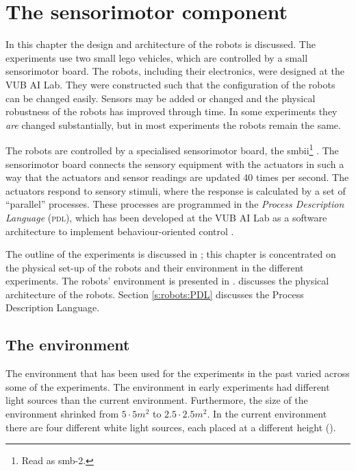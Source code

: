 \chapter{The sensorimotor component}\label{ch:robots}

In this chapter the design and architecture of the robots is discussed. The experiments use two small {\sc lego} vehicles, which are controlled by a small sensorimotor board. The robots, including their electronics, were designed at the VUB AI Lab. They were constructed such that the configuration of the robots can be changed easily. Sensors may be added or changed and the physical robustness of the robots has improved through time. In some experiments they {\it are} changed substantially, but in most experiments the robots remain the same.

The robots are controlled by a specialised sensorimotor board, the {\sc smbii}\footnote{Read as {\sc smb}-2.} \citep{vereertbrugghen:1996}. The sensorimotor board connects the sensory equipment with the actuators in such a way that the actuators and sensor readings are updated 40 times per second. The actuators respond to sensory stimuli, where the response is calculated by a set of ``parallel'' processes. These processes are programmed in the {\em Process Description Language} (\textsc{pdl}), which has been developed at the VUB AI Lab as a software architecture to implement behaviour-oriented control \citep{steels:1994b}. 

The outline of the experiments is discussed in ; this chapter is concentrated on the physical set-up of the robots and their environment in the different experiments. The robots' environment is presented in .  discusses the physical architecture of the robots. Section \ref{s:robots:PDL} discusses the Process Description Language. 

\section{The environment}\label{s:robots:envir}

The environment that has been used for the experiments in the past varied across some of the experiments. The environment in early experiments \citep{steelsvogt:1997,vogt:1998b,vogt:1998a} had different light sources than the current environment. Furthermore, the size of the environment shrinked from $5\cdot 5 m^2$ to $2.5\cdot 2.5 m^2$. In the current environment there are four different white light sources, each placed at a different height ().

